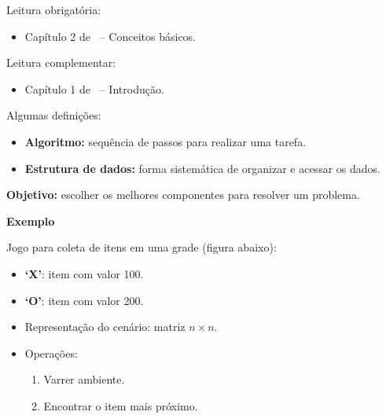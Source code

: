 \newcommand{\templatesdir}{../../../templates}
\newcommand{\template}{template-roteiro-est}


\newcommand{\content}{Introdução}
\newcommand{\class}{Algoritmos e Estruturas de Dados}
\newcommand{\shortcourse}{45EST}



\makeheader

Leitura obrigatória:
\begin{itemize}
	\item Capítulo 2 de~\cite{EdelweissAndGalante2009} -- Conceitos básicos.
\end{itemize}
Leitura complementar:
\begin{itemize}
	\item Capítulo 1 de~\cite{Pereira2008} -- Introdução.
\end{itemize}

\medskip


Algumas definições:
\begin{itemize}
	\item \textbf{Algoritmo:} sequência de passos para realizar uma tarefa.
	\item \textbf{Estrutura de dados:} forma sistemática de organizar e acessar os dados.
\end{itemize}

\textbf{Objetivo:} escolher os melhores componentes para resolver um problema.

\medskip

\textbf{Exemplo}

Jogo para coleta de itens em uma grade (figura abaixo):
\begin{itemize}
	\item \textbf{`X'}: item com valor 100.
	\item \textbf{`O'}: item com valor 200.
	\item Representação do cenário: matriz $n \times n$.
	\item Operações:
	\begin{enumerate}
		\item Varrer ambiente.
		\item Encontrar o item mais próximo.
	\end{enumerate}
\end{itemize}

